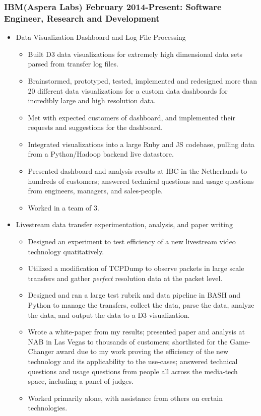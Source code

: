 \documentclass[a4paper,10pt,notitlepage]{article}
\begin{document}
\subsubsection*{IBM(Aspera Labs) February 2014-Present: Software Engineer, Research and Development}
	\begin{itemize}
	\vspace{-5pt}\item 	Data Visualization Dashboard and Log File Processing \begin{itemize}
					\item 	Built D3 data visualizations for extremely high dimensional data sets parsed from transfer log files. 
					\item 	Brainstormed, prototyped, tested, implemented and redesigned more than 20 different data visualizations for a custom data dashboards for incredibly large and high resolution data. 
					\item 	Met with expected customers of dashboard, and implemented their requests and suggestions for the dashboard. 
					\item 	Integrated visualizations into a large Ruby and JS codebase, pulling data from a Python/Hadoop backend live datastore. 
					\item 	Presented dashboard and analysis results at IBC in the Netherlands to hundreds of customers; answered technical questions and usage questions from engineers, managers, and sales-people. 
					\item 	Worked in a team of 3.
					\end{itemize}
	\vspace{-5pt}\item 	Livestream data transfer experimentation, analysis, and paper writing \begin{itemize}
					\item 	Designed an experiment to test efficiency of a new livestream video technology quatitatively. 
					\item 	Utilized a modification of TCPDump to observe packets in large scale transfers and gather \textit{perfect} resolution data at the packet level. 
					\item 	Designed and ran a large test rubrik and data pipeline in BASH and Python to manage the transfers, collect the data, parse the data, analyze the data, and output the data to a D3 visualization. 
					\item 	Wrote a white-paper from my results; presented paper and analysis at NAB in Las Vegas to thousands of customers; shortlisted for the Game-Changer award due to my work proving the efficiency of the new technology and its applicability to the use-cases; answered technical questions and usage questions from people all across the media-tech space, including a panel of judges. 							\item 	Worked primarily alone, with assistance from others on certain technologies.

\end{itemize}
\end{itemize}
\end{document}
